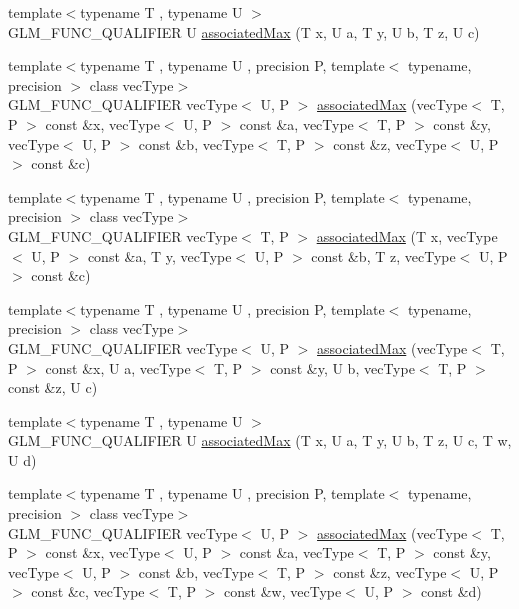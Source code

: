 \begin{DoxyCompactItemize}
\item 
{\footnotesize template$<$typename T , typename U $>$ }\\G\+L\+M\+\_\+\+F\+U\+N\+C\+\_\+\+Q\+U\+A\+L\+I\+F\+I\+E\+R U \hyperlink{group__gtx__associated__min__max_gaec891e363d91abbf3a4443cf2f652209}{associated\+Max} (T x, U a, T y, U b, T z, U c)
\item 
{\footnotesize template$<$typename T , typename U , precision P, template$<$ typename, precision $>$ class vec\+Type$>$ }\\G\+L\+M\+\_\+\+F\+U\+N\+C\+\_\+\+Q\+U\+A\+L\+I\+F\+I\+E\+R vec\+Type$<$ U, P $>$ \hyperlink{group__gtx__associated__min__max_ga065a0c1eb7837118ef79be88dfd78487}{associated\+Max} (vec\+Type$<$ T, P $>$ const \&x, vec\+Type$<$ U, P $>$ const \&a, vec\+Type$<$ T, P $>$ const \&y, vec\+Type$<$ U, P $>$ const \&b, vec\+Type$<$ T, P $>$ const \&z, vec\+Type$<$ U, P $>$ const \&c)
\item 
{\footnotesize template$<$typename T , typename U , precision P, template$<$ typename, precision $>$ class vec\+Type$>$ }\\G\+L\+M\+\_\+\+F\+U\+N\+C\+\_\+\+Q\+U\+A\+L\+I\+F\+I\+E\+R vec\+Type$<$ T, P $>$ \hyperlink{group__gtx__associated__min__max_ga553431a468e251623408603bcb51c9cb}{associated\+Max} (T x, vec\+Type$<$ U, P $>$ const \&a, T y, vec\+Type$<$ U, P $>$ const \&b, T z, vec\+Type$<$ U, P $>$ const \&c)
\item 
{\footnotesize template$<$typename T , typename U , precision P, template$<$ typename, precision $>$ class vec\+Type$>$ }\\G\+L\+M\+\_\+\+F\+U\+N\+C\+\_\+\+Q\+U\+A\+L\+I\+F\+I\+E\+R vec\+Type$<$ U, P $>$ \hyperlink{group__gtx__associated__min__max_ga327136e6a568569c03a056f90814b656}{associated\+Max} (vec\+Type$<$ T, P $>$ const \&x, U a, vec\+Type$<$ T, P $>$ const \&y, U b, vec\+Type$<$ T, P $>$ const \&z, U c)
\item 
{\footnotesize template$<$typename T , typename U $>$ }\\G\+L\+M\+\_\+\+F\+U\+N\+C\+\_\+\+Q\+U\+A\+L\+I\+F\+I\+E\+R U \hyperlink{group__gtx__associated__min__max_ga3038ffcb43eaa6af75897a99a5047ccc}{associated\+Max} (T x, U a, T y, U b, T z, U c, T w, U d)
\item 
{\footnotesize template$<$typename T , typename U , precision P, template$<$ typename, precision $>$ class vec\+Type$>$ }\\G\+L\+M\+\_\+\+F\+U\+N\+C\+\_\+\+Q\+U\+A\+L\+I\+F\+I\+E\+R vec\+Type$<$ U, P $>$ \hyperlink{group__gtx__associated__min__max_gaf607886421c35cd7e4f41a50d7c330e3}{associated\+Max} (vec\+Type$<$ T, P $>$ const \&x, vec\+Type$<$ U, P $>$ const \&a, vec\+Type$<$ T, P $>$ const \&y, vec\+Type$<$ U, P $>$ const \&b, vec\+Type$<$ T, P $>$ const \&z, vec\+Type$<$ U, P $>$ const \&c, vec\+Type$<$ T, P $>$ const \&w, vec\+Type$<$ U, P $>$ const \&d)

\end{DoxyCompactItemize}
